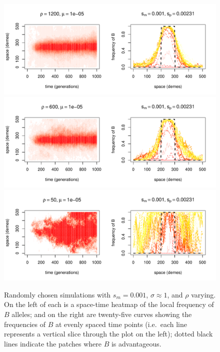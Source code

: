 \documentclass{article}
\begin{document}
\begin{figure}
  \begin{center}
    \includegraphics{example-mutation-sims/59611-r1-501-sb0_01-sm-0_001-N1200-pophistory-run}
    \includegraphics{example-mutation-sims/93713-r1-501-sb0_01-sm-0_001-N600-pophistory-run}
    \includegraphics{example-mutation-sims/29850-r1-501-sb0_01-sm-0_001-N50-pophistory-run}
  \end{center}
  \caption{
    Randomly chosen simulations with $s_m=0.001$, $\sigma\approx 1$, and $\rho$ varying.
    On the left of each is a space-time heatmap of the local frequency of $B$ alleles;
    and on the right are twenty-five curves showing the frequencies of $B$ at evenly spaced time points
    (i.e.\ each line represents a vertical slice through the plot on the left);
    dotted black lines indicate the patches where $B$ is advantageous.
  } \label{sfig:sims_3}
\end{figure}
\end{document}
